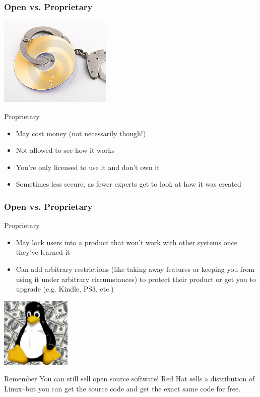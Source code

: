 \documentclass{beamer}
\begin{document}
\begin{frame}
  \frametitle{Open vs. Proprietary}
  \begin{center}\includegraphics[width=0.4\textwidth]{../img/proprietary}\end{center}  \begin{Large} Proprietary \end{Large}
  \begin{itemize}
  \item May cost \textcolor{beamer@mygreen}{money} (not necessarily though!)
  \item \textcolor{beamer@mygreen}{Not} allowed to see how it works
  \item You're only \textcolor{beamer@mygreen}{licensed} to use it and don't own it
  \item Sometimes less \textcolor{beamer@mygreen}{secure}, as fewer experts get to look at how it was created

  \end{itemize}

\end{frame}

\begin{frame}
  \frametitle{Open vs. Proprietary}
  \begin{Large} Proprietary \end{Large}
  \begin{itemize}
  \item May \textcolor{beamer@mygreen}{lock} users into a product that won't work with other systems once they've learned it
    
  \item Can add arbitrary \textcolor{beamer@mygreen}{restrictions} (like taking away features or keeping you from using it under arbitrary circumstances) to protect their product or get you to upgrade (e.g. Kindle, PS3, etc.)
  \end{itemize}

  \begin{center}\includegraphics[width=0.25\textwidth]{../img/tuxmoney}\end{center}
  \begin{block}{Remember}
    You can still sell open source software! Red Hat sells a distribution of Linux--but you can get the source code and get the exact same code for free.
  \end{block}
\end{frame}
\end{document}
